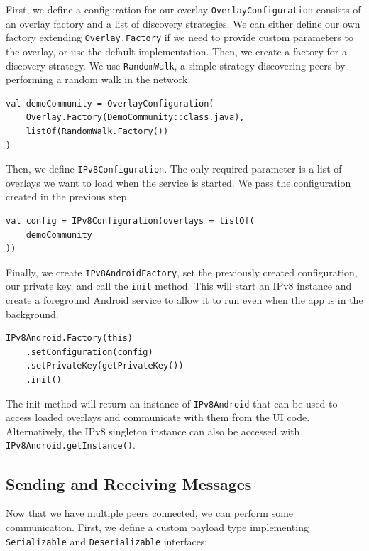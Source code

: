 First, we define a configuration for our overlay \texttt{OverlayConfiguration} consists of an overlay factory and a list of discovery strategies. We can either define our own factory extending \texttt{Overlay.Factory} if we need to provide custom parameters to the overlay, or use the default implementation. Then, we create a factory for a discovery strategy. We use \texttt{RandomWalk}, a simple strategy discovering peers by performing a random walk in the network.

\begin{verbatim}
val demoCommunity = OverlayConfiguration(
    Overlay.Factory(DemoCommunity::class.java),
    listOf(RandomWalk.Factory())
)
\end{verbatim}

Then, we define \texttt{IPv8Configuration}. The only required parameter is a list of overlays we want to load when the service is started. We pass the configuration created in the previous step.

\begin{verbatim}
val config = IPv8Configuration(overlays = listOf(
    demoCommunity
))
\end{verbatim}

Finally, we create \texttt{IPv8AndroidFactory}, set the previously created configuration, our private key, and call the \texttt{init} method. This will start an IPv8 instance and create a foreground Android service to allow it to run even when the app is in the background.

\begin{verbatim}
IPv8Android.Factory(this)
    .setConfiguration(config)
    .setPrivateKey(getPrivateKey())
    .init()
\end{verbatim}

The init method will return an instance of \texttt{IPv8Android} that can be used to access loaded overlays and communicate with them from the UI code. Alternatively, the IPv8 singleton instance can also be accessed with \texttt{IPv8Android.getInstance()}.


\subsection{Sending and Receiving Messages}

Now that we have multiple peers connected, we can perform some communication. First, we define a custom payload type implementing \texttt{Serializable} and \texttt{Deserializable} interfaces:

